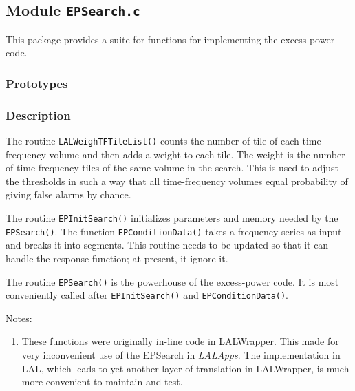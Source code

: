 \newpage
\subsection{Module \texttt{EPSearch.c}}
\label{ss:EPSearch.c}

This package provides a suite for functions for implementing the
excess power code. 

\subsubsection*{Prototypes}
\vspace{0.1in}






\subsubsection*{Description}

The routine \verb+LALWeighTFTileList()+ counts the number of tile of
each time-frequency volume and then adds a weight to each tile.  The
weight is the number of time-frequency tiles of the same volume in the
search.  This is used to adjust the thresholds in such a way that all
time-frequency volumes equal probability of giving false alarms by
chance.  

The routine \verb+EPInitSearch()+ initializes parameters and memory
needed by the \verb+EPSearch()+.     The function
\verb+EPConditionData()+ takes a frequency series as input and breaks
it into segments.   This routine needs to be updated so that it can
handle the response function;  at present, it ignore it.

The routine \verb+EPSearch()+ is the powerhouse of the excess-power
code.  It is most conveniently called after \verb+EPInitSearch()+ and 
\verb+EPConditionData()+.


Notes:
\begin{enumerate}
\item These functions were originally in-line code in LALWrapper.
This made for very inconvenient use of the EPSearch in \emph{LALApps}.
The implementation in LAL,  which leads to yet another layer of
translation in LALWrapper,  is much more convenient to maintain and
test.
\end{enumerate}

